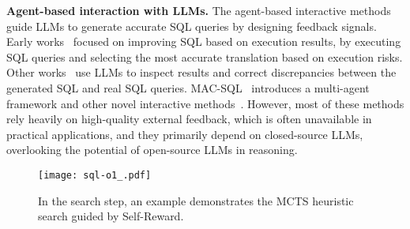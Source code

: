 \noindent \textbf{Agent-based interaction with LLMs.}
The agent-based interactive methods~\cite{DBLP:conf/acl/ChenWMP0024} guide LLMs to generate accurate SQL queries by designing feedback signals. Early works~\cite{DBLP:conf/emnlp/ShiFGZW22} focused on improving SQL based on execution results, by executing SQL queries and selecting the most accurate translation based on execution risks. Other works~\cite{DBLP:conf/iclr/ChenLSZ24, DBLP:conf/pricai/GuoTTWWYW23} use LLMs to inspect results and correct discrepancies between the generated SQL and real SQL queries. MAC-SQL~\cite{wang2024macsql} introduces a multi-agent framework and other novel interactive methods~\cite{xiong2024interactive}. However, most of these methods rely heavily on high-quality external feedback, which is often unavailable in practical applications, and they primarily depend on closed-source LLMs, overlooking the potential of open-source LLMs in reasoning.


\begin{figure*}[bht!]  %
    \centering
    \texttt{[image: sql-o1\_.pdf]}  %
    \caption{In the search step, an example demonstrates the MCTS heuristic search guided by Self-Reward.}
    \label{fig:sql-o1}
\end{figure*}



%